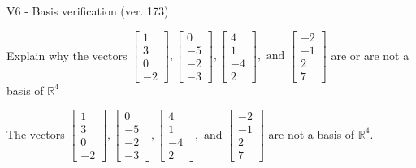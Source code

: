 \begin{exercise}
  \begin{exerciseTitle}V6 - Basis verification (ver. 173)\end{exerciseTitle}
  \begin{exerciseStatement}
    Explain why the vectors \(\left[\begin{array}{r}
1 \\
3 \\
0 \\
-2
\end{array}\right] , \left[\begin{array}{r}
0 \\
-5 \\
-2 \\
-3
\end{array}\right] , \left[\begin{array}{r}
4 \\
1 \\
-4 \\
2
\end{array}\right] , \text{ and } \left[\begin{array}{r}
-2 \\
-1 \\
2 \\
7
\end{array}\right]\) are or are not a basis of \(\mathbb{R}^4\)	


  \end{exerciseStatement}
  \begin{exerciseAnswer}
   The vectors \(\left[\begin{array}{r}
1 \\
3 \\
0 \\
-2
\end{array}\right] , \left[\begin{array}{r}
0 \\
-5 \\
-2 \\
-3
\end{array}\right] , \left[\begin{array}{r}
4 \\
1 \\
-4 \\
2
\end{array}\right] , \text{ and } \left[\begin{array}{r}
-2 \\
-1 \\
2 \\
7
\end{array}\right]\) 
  	 are not  a basis of \(\mathbb{R}^4\).
  


  \end{exerciseAnswer}
\end{exercise}